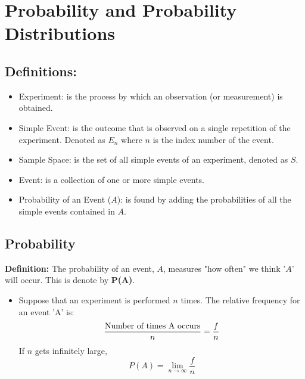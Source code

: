 \documentclass[12pt, letterpaper]{article}
\begin{document}
    \section{Probability and Probability Distributions}
        \subsection{Definitions:}
            \begin{itemize}
                \item Experiment: is the process by which an observation (or measurement) is obtained.
                \item Simple Event: is the outcome that is observed on a single repetition of the experiment. Denoted as $E_n$ where $n$ is the index number of the event.
                \item Sample Space: is the set of all simple events of an experiment, denoted as $S$.
                \item Event: is a collection of one or more simple events.
                \item Probability of an Event ($A$): is found by adding the probabilities of all the simple events contained in $A$.
            \end{itemize}
        \subsection{Probability}
            \textbf{Definition:} The probability of an event, $A$, measures "how often" we think '$A$' will occur. This is denote by \textbf{P(A)}.
            \begin{itemize}
                \item Suppose that an experiment is performed $n$ times. The relative frequency for an event 'A' is:
                    \begin{equation}
                        \frac{\textnormal{Number of times A occurs}}{n} = \frac{f}{n}
                    \end{equation}
                    If $n$ gets infinitely large,
                    \begin{equation}
                        P(A) = \lim_{n \to \infty}\frac{f}{n}
                    \end{equation}
            \end{itemize}
\end{document}
